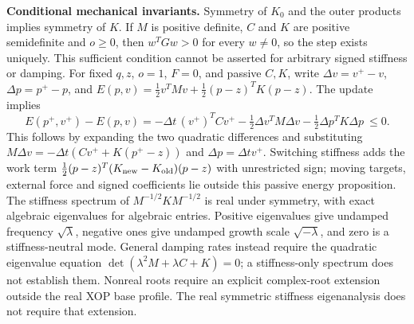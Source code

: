 \textbf{Conditional mechanical invariants.} Symmetry of $K_0$ and the outer
products implies symmetry of $K$. If $M$ is positive definite, $C$ and $K$ are
positive semidefinite and $o\ge0$, then $w^TGw>0$ for every $w\ne0$, so the step
exists uniquely. This sufficient condition cannot be asserted for arbitrary
signed stiffness or damping. For fixed $q,z$, $o=1$, $F=0$, and passive $C,K$,
write $\Delta v=v^+-v$, $\Delta p=p^+-p$, and
$E(p,v)=\tfrac12v^TMv+\tfrac12(p-z)^TK(p-z)$. The update implies
\begin{equation}
 E(p^+,v^+)-E(p,v)
 =-\Delta t\,(v^+)^TCv^+
  -\tfrac12\Delta v^TM\Delta v
  -\tfrac12\Delta p^TK\Delta p\ \le0 .
\end{equation}
This follows by expanding the two quadratic differences and substituting
$M\Delta v=-\Delta t(Cv^++K(p^+-z))$ and $\Delta p=\Delta t v^+$.
Switching stiffness adds the work term
$\tfrac12(p-z)^T(K_{\rm new}-K_{\rm old})(p-z)$ with unrestricted sign;
moving targets, external force and signed coefficients lie outside this passive
energy proposition. The stiffness spectrum of $M^{-1/2}KM^{-1/2}$ is real
under symmetry, with exact algebraic eigenvalues for algebraic entries.
Positive eigenvalues give undamped frequency $\sqrt\lambda$, negative ones
give undamped growth scale $\sqrt{-\lambda}$, and zero is a stiffness-neutral
mode. General damping rates instead require the quadratic eigenvalue equation
$\det(\lambda^2M+\lambda C+K)=0$; a stiffness-only spectrum does not establish them.
Nonreal roots require an explicit complex-root extension outside the real XOP
base profile. The real symmetric stiffness eigenanalysis does not require that
extension.

